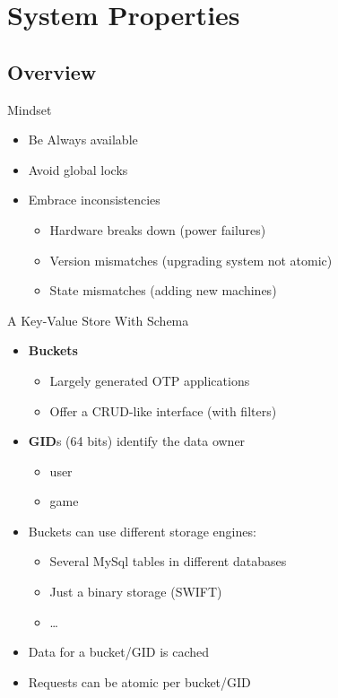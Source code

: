 \documentclass[aspectratio=169]{beamer}
\begin{document}
\section{System Properties}

\subsection{Overview}

\begin{frame}{Mindset}
    \begin{itemize}
        \item Be Always available
        \item Avoid global locks
        \item Embrace inconsistencies
            \begin{itemize}
                \item Hardware breaks down (power failures)
                \item Version mismatches (upgrading system not atomic)
                \item State mismatches (adding new machines)
            \end{itemize}
    \end{itemize}
\end{frame}

\begin{frame}{A Key-Value Store With Schema}
    \begin{itemize}
        \item \textbf{Buckets}
            \begin{itemize}
                \item Largely generated OTP applications
                \item Offer a CRUD-like interface (with filters)
            \end{itemize}
        \item \textbf{GID}s (64 bits) identify the data owner
            \begin{itemize}
                \item user
                \item game
            \end{itemize}
        \item Buckets can use different storage engines:
            \begin{itemize}
                \item Several MySql tables in different databases
                \item Just a binary storage (SWIFT)
                \item \dots
            \end{itemize}
        \item Data for a bucket/GID is cached
        \item Requests can be atomic per bucket/GID
    \end{itemize}
\end{frame}
\end{document}
